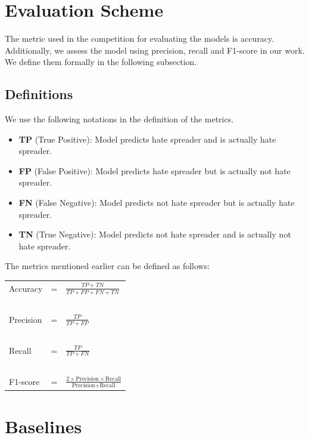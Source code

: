 \section{Evaluation Scheme}
The metric used in the competition for evaluating the models is accuracy. Additionally, we assess the model using precision, recall and F1-score in our work. We define them formally in the following subsection.

\subsection{Definitions}
We use the following notations in the definition of the metrics.
\begin{itemize}
    \item \textbf{TP} (True Positive): Model predicts hate spreader and is actually hate spreader.
    \item \textbf{FP} (False Positive): Model predicts hate spreader but is actually not hate spreader.
    \item \textbf{FN} (False Negative): Model predicts not hate spreader but is actually hate spreader.
    \item \textbf{TN} (True Negative): Model predicts not hate spreader and is actually not hate spreader.
\end{itemize}

The metrics mentioned earlier can be defined as follows:
\begin{table}[htpb]
\centering
\begin{tabular}{lcl}
Accuracy & = & $\frac{TP + TN}{TP + FP + FN + TN}$ \\
~ & ~ & ~ \\
Precision & = & $\frac{TP}{TP + FP}$ \\
~ & ~ & ~ \\
Recall & = & $\frac{TP}{TP + FN}$ \\
~ & ~ & ~ \\
F1-score & = & $\frac{2 \times \text{Precision} \times
\text{Recall}}{\text{Precision}+\text{Recall}}$ \\
\end{tabular}
\end{table}

\section{Baselines}

